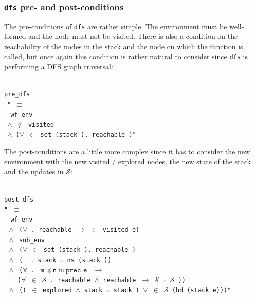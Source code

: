 \documentclass[a4 paper, 12pt]{article}
\newcommand{\stackprec}[3]{\texttt{#1}~\preceq~\texttt{#2}~\text{in}~\texttt{#3}}
\newcommand{\where}{{\color{isa_green}{where}}}
\newcommand{\isa}[1]{\small\texttt{\\\noindent#1}}
\newcommand{\blue}[1]{{\color{isa_dark_blue}{#1}}}
\newcommand{\bblue}[1]{{\color{isa_blue}{#1}}}
\newcommand{\green}[1]{{\color{isa_dark_green}{#1}}}
\theoremstyle{definition}
\begin{document}
\BlankLine
\BlankLine

\subsubsection{\texttt{dfs} pre- and post-conditions}
The pre-conditions of \texttt{dfs} are rather simple. The environment must be well-formed and the node must not be visited. There is also a condition on the reachability of the nodes in the stack and the node on which the function is called, but once again this condition is rather natural to consider since \texttt{dfs} is performing a DFS graph traversal:

\isa{
\bblue{definition} pre\_dfs \where\\
$~~$"\blue{pre\_dfs} \green{v e} $\equiv$\\
$~~~~$wf\_env \green{e}\\
$~~$$\wedge$ \green{v} $\notin$ visited \green{e}\\
$~~$$\wedge$ ($\forall$ \green{n} $\in$ set (stack \green{e}). reachable \green{n v})"
}

\BlankLine
\BlankLine

The post-conditions are a little more complex since it has to consider the new environment with the new visited / explored nodes, the new state of the stack and the updates in $\mathcal{S}$:

\isa{
\bblue{definition} post\_dfs \where\\ 
"\blue{post\_dfs} \green{v prev\_e e} $\equiv$\\
$~~~~$wf\_env \green{e}\\
$~~\wedge$ ($\forall$ \green{x}. reachable \green{v} \green{x} $\longrightarrow$ \green{x} $\in$ visited e)\\
$~~\wedge$ sub\_env \green{prev\_e} \green{e}\\
$~~\wedge$ ($\forall$ \green{n} $\in$ set (stack \green{e}). reachable \green{n} \green{v})\\
$~~\wedge$ ($\exists$ \green{ns}. stack \green{prev\_e} = ns \@ (stack \green{e}))\\
$~~\wedge$ ($\forall$ \green{m n}. $\stackprec{m}{n}{prec\_e}$ $\longrightarrow$ \\ $~~~~~~$ ($\forall$ \green{u} $\in$ $\mathcal{S}$ \green{prev\_e m}. reachable \green{u} \green{v} $\wedge$ reachable \green{v} \green{n} $\longrightarrow$ $\mathcal{S}$ \green{e m} = $\mathcal{S}$ \green{e n}))\\
$~~\wedge$ ((\green{v} $\in$ explored \green{e} $\wedge$ stack \green{e} = stack \green{prev\_e}) $\lor$ \green{v} $\in$ $\mathcal{S}$ \green{e} (hd (stack e)))"
}
\end{document}
